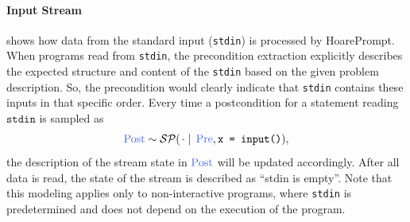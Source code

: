 \documentclass[sigconf]{acmart}
\makeatletter
\newcommand{\projName}{HoarePrompt\xspace}
\def\mathcolor#1#{\@mathcolor{#1}}
\def\@mathcolor#1#2#3{%
  \protect\leavevmode
  \begingroup
    \color#1{#2}#3%
  \endgroup
}
\makeatother
\begin{document}
\paragraph*{Input Stream}  shows how data from the standard input (\texttt{stdin}) is processed by \projName. When programs read from \texttt{stdin}, the precondition extraction explicitly describes the expected structure and content of the \texttt{stdin} based on the given problem description. So, the precondition would clearly indicate that \texttt{stdin} contains these inputs in that specific order. Every time a postcondition for a statement reading $\texttt{stdin}$ is sampled as $$\mathcolor{softblue}{\mathrm{Post}}\sim \mathcal{SP}(\,\cdot\mid\,\mathcolor{softblue}{\text{Pre}}, \texttt{x\ = input()}),$$ the description of the stream state in $\mathcolor{softblue}{\mathrm{Post}}$ will be updated accordingly. After all data is read, the state of the stream is described as ``stdin is empty''. Note that this modeling applies only to non-interactive programs, where \texttt{stdin} is predetermined and does not depend on the execution of the program.

\end{document}
